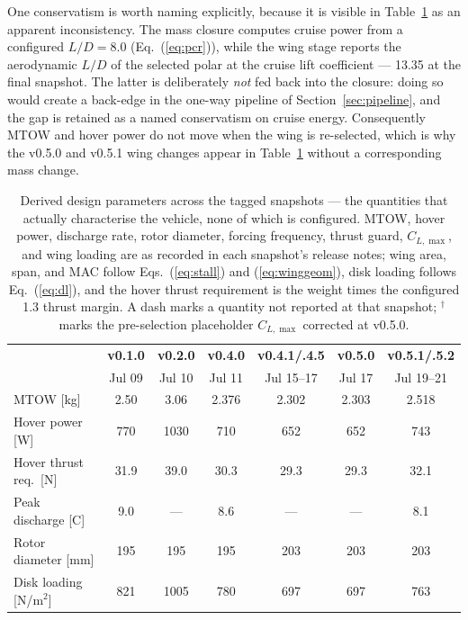 One conservatism is worth naming explicitly, because it is visible in
Table~\ref{tab:derived} as an apparent inconsistency. The mass closure
computes cruise power from a configured $L/D=8.0$
(Eq.~(\ref{eq:pcr})), while the wing stage reports the aerodynamic
$L/D$ of the selected polar at the cruise lift coefficient --- 13.35 at
the final snapshot. The latter is deliberately \emph{not} fed back into
the closure: doing so would create a back-edge in the one-way pipeline
of Section~\ref{sec:pipeline}, and the gap is retained as a named
conservatism on cruise energy. Consequently MTOW and hover power do not
move when the wing is re-selected, which is why the v0.5.0 and v0.5.1
wing changes appear in Table~\ref{tab:derived} without a corresponding
mass change.

\begin{table}[htbp]
\centering
\caption{Derived design parameters across the tagged snapshots ---
the quantities that actually characterise the vehicle, none of which is
configured. MTOW, hover power, discharge rate, rotor diameter, forcing
frequency, thrust guard, $C_{L,\max}$, and wing loading are as recorded
in each snapshot's release notes; wing area, span, and MAC follow
Eqs.~(\ref{eq:stall}) and (\ref{eq:winggeom}), disk loading follows
Eq.~(\ref{eq:dl}), and the hover thrust requirement is the weight
times the configured 1.3 thrust margin. A dash marks a quantity not
reported at that snapshot; $^{\dagger}$ marks the pre-selection
placeholder $C_{L,\max}$ corrected at v0.5.0.}
\label{tab:derived}
\footnotesize
\setlength{\tabcolsep}{3.5pt}
\begin{tabular}{@{}lcccccc@{}}
\toprule
& \textbf{v0.1.0} & \textbf{v0.2.0} & \textbf{v0.4.0}
& \textbf{v0.4.1/.4.5} & \textbf{v0.5.0} & \textbf{v0.5.1/.5.2} \\
& Jul 09 & Jul 10 & Jul 11 & Jul 15--17 & Jul 17 & Jul 19--21 \\
\midrule
MTOW [kg]                          & 2.50 & 3.06 & 2.376 & 2.302 & 2.303 & 2.518 \\
Hover power [W]                    & 770  & 1030 & 710   & 652   & 652   & 743 \\
Hover thrust req.\ [N]             & 31.9 & 39.0 & 30.3  & 29.3  & 29.3  & 32.1 \\
Peak discharge [C]                 & 9.0  & ---  & 8.6   & ---   & ---   & 8.1 \\
\addlinespace
Rotor diameter [mm]                & 195  & 195  & 195   & 203   & 203   & 203 \\
Disk loading [N/m$^2$]             & 821  & 1005 & 780   & 697   & 697   & 763 \\

\end{tabular}
\end{table}
